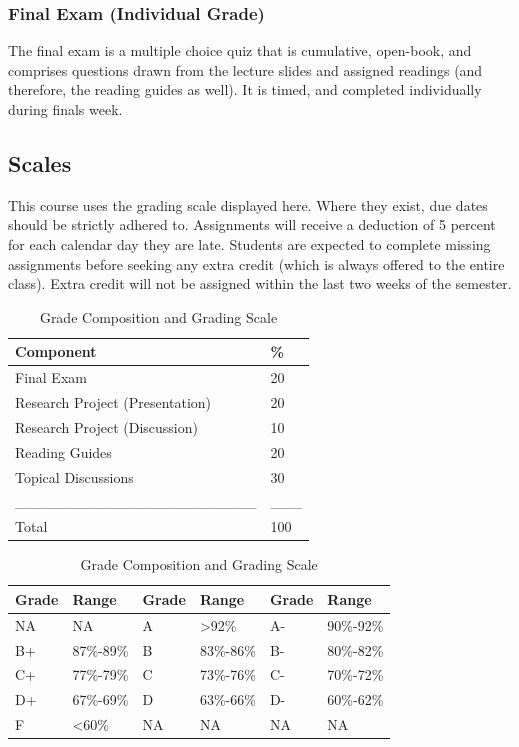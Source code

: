\documentclass[10pt,]{article}
\begin{document}
\hypertarget{final-exam-individual-grade}{%
\subsubsection{Final Exam (Individual
Grade)}\label{final-exam-individual-grade}}

The final exam is a multiple choice quiz that is cumulative, open-book,
and comprises questions drawn from the lecture slides and assigned
readings (and therefore, the reading guides as well). It is timed, and
completed individually during finals week.

\hypertarget{scales}{%
\subsection{Scales}\label{scales}}

This course uses the grading scale displayed here. Where they exist, due
dates should be strictly adhered to. Assignments will receive a
deduction of 5 percent for each calendar day they are late. Students are
expected to complete missing assignments before seeking any extra credit
(which is always offered to the entire class). Extra credit will not be
assigned within the last two weeks of the semester.

\begin{table}[!h]
\caption{\label{tab:unnamed-chunk-2}Grade Composition and Grading Scale}

\centering
\begin{tabular}[t]{ll}
\toprule
Component & \%\\
\midrule
Final Exam & 20\\
Research Project (Presentation) & 20\\
Research Project (Discussion) & 10\\
Reading Guides & 20\\
Topical Discussions & 30\\
\addlinespace
\_\_\_\_\_\_\_\_\_\_\_\_\_\_\_\_\_\_\_\_\_\_\_ & \_\_\_\\
Total & 100\\
\bottomrule
\end{tabular}
\centering
\begin{tabular}[t]{llllll}
\toprule
Grade & Range & Grade & Range & Grade & Range\\
\midrule
NA & NA & A & >92\% & A- & 90\%-92\%\\
B+ & 87\%-89\% & B & 83\%-86\% & B- & 80\%-82\%\\
C+ & 77\%-79\% & C & 73\%-76\% & C- & 70\%-72\%\\
D+ & 67\%-69\% & D & 63\%-66\% & D- & 60\%-62\%\\
F & <60\% & NA & NA & NA & NA\\
\bottomrule
\end{tabular}
\end{table}
\end{document}
